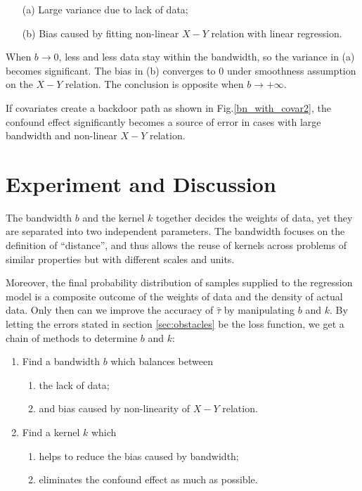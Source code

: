 \documentclass[a4 paper,12pt]{article}
\begin{document}
\begin{enumerate}
   \item[(a)] Large variance due to lack of data;
   \item[(b)] Bias caused by fitting non-linear $X-Y$ relation with linear regression.
\end{enumerate}

When $b\to 0$, less and less data stay within the bandwidth, so the variance in (a) becomes significant. The bias in (b) converges to $0$ under smoothness assumption on the $X-Y$ relation. The conclusion is opposite when $b\to+\infty$.

If covariates create a backdoor path as shown in Fig.\ref{bn_with_covar2}, the confound effect significantly becomes a source of error in cases with large bandwidth and non-linear $X-Y$ relation.

\section{Experiment and Discussion}

The bandwidth $b$ and the kernel $k$ together decides the weights of data,
yet they are separated into two independent parameters.
The bandwidth focuses on the definition of ``distance'',
and thus allows the reuse of kernels across problems of similar properties but with different scales and units.

Moreover, the final probability distribution of samples supplied to the regression model is a composite outcome of the weights of data and the density of actual data.
Only then can we improve the accuracy of $\hat\tau$ by manipulating $b$ and $k$.
By letting the errors stated in section \ref{sec:obstacles} be the loss function, we get a chain of methods to determine $b$ and $k$:
\begin{enumerate}
   \item Find a bandwidth $b$ which balances between
   \begin{enumerate}
      \item the lack of data;
      \item and bias caused by non-linearity of $X-Y$ relation.
   \end{enumerate}
   \item Find a kernel $k$ which
   \begin{enumerate}
      \item helps to reduce the bias caused by bandwidth;
      \item eliminates the confound effect as much as possible.
   \end{enumerate}
\end{enumerate}
\end{document}
